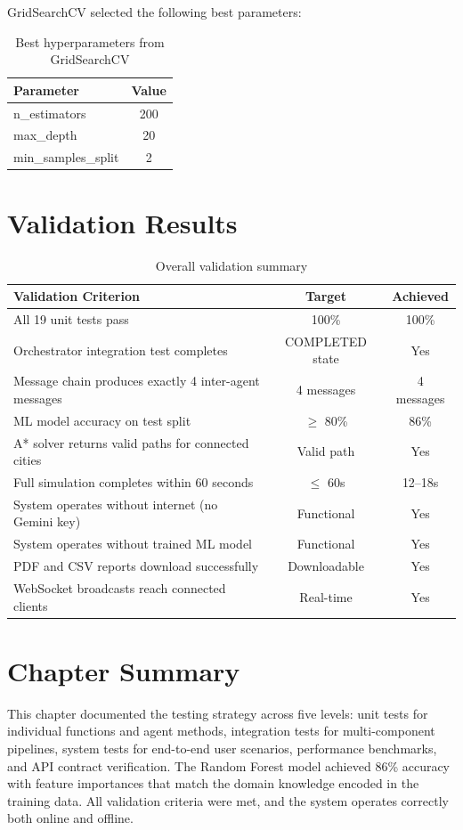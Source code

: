GridSearchCV selected the following best parameters:

\begin{table}[H]
\centering
\caption{Best hyperparameters from GridSearchCV}
\label{tab:best_params}
\begin{tabular}{|l|c|}
\hline
\textbf{Parameter} & \textbf{Value} \\
\hline
n\_estimators & 200 \\
\hline
max\_depth & 20 \\
\hline
min\_samples\_split & 2 \\
\hline
\end{tabular}
\end{table}

\section{Validation Results}
\label{sec:validation_results}

\begin{table}[H]
\centering
\caption{Overall validation summary}
\label{tab:validation_summary}
\begin{tabularx}{\textwidth}{|X|c|c|}
\hline
\textbf{Validation Criterion} & \textbf{Target} & \textbf{Achieved} \\
\hline
All 19 unit tests pass & 100\% & 100\% \\
\hline
Orchestrator integration test completes & COMPLETED state & Yes \\
\hline
Message chain produces exactly 4 inter-agent messages & 4 messages & 4 messages \\
\hline
ML model accuracy on test split & $\geq$ 80\% & 86\% \\
\hline
A* solver returns valid paths for connected cities & Valid path & Yes \\
\hline
Full simulation completes within 60 seconds & $\leq$ 60s & 12--18s \\
\hline
System operates without internet (no Gemini key) & Functional & Yes \\
\hline
System operates without trained ML model & Functional & Yes \\
\hline
PDF and CSV reports download successfully & Downloadable & Yes \\
\hline
WebSocket broadcasts reach connected clients & Real-time & Yes \\
\hline
\end{tabularx}
\end{table}

\section{Chapter Summary}
\label{sec:ch7_summary}

This chapter documented the testing strategy across five levels: unit tests for individual functions and agent methods, integration tests for multi-component pipelines, system tests for end-to-end user scenarios, performance benchmarks, and API contract verification. The Random Forest model achieved 86\% accuracy with feature importances that match the domain knowledge encoded in the training data. All validation criteria were met, and the system operates correctly both online and offline.
